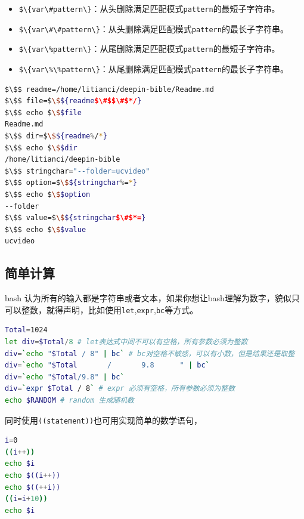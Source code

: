 \documentclass[doctor,openright,twoside]{sjtuthesis}
\providecommand{\tightlist}{%
    \setlength{\itemsep}{0pt}\setlength{\parskip}{0pt}}
\newcommand{\passthrough}[1]{#1}
\theoremstyle{plain}
\theoremstyle{definition}
\theoremstyle{remark}
\theoremstyle{ocrenumbox}
\theoremstyle{plain}
\begin{document}
\begin{itemize}
\tightlist
\item
  \passthrough{\lstinline!$\{var\#pattern\}!}：从头删除满足匹配模式\passthrough{\lstinline!pattern!}的最短子字符串。
\item
  \passthrough{\lstinline!$\{var\#\#pattern\}!}：从头删除满足匹配模式\passthrough{\lstinline!pattern!}的最长子字符串。
\item
  \passthrough{\lstinline!$\{var\%pattern\}!}：从尾删除满足匹配模式\passthrough{\lstinline!pattern!}的最短子字符串。
\item
  \passthrough{\lstinline!$\{var\%\%pattern\}!}：从尾删除满足匹配模式\passthrough{\lstinline!pattern!}的最长子字符串。
\end{itemize}

\lstset{mathescape=true}

\begin{lstlisting}[language=bash]
$\$$ readme=/home/litianci/deepin-bible/Readme.md
$\$$ file=$\$${readme$\#$$\#$*/}
$\$$ echo $\$$file 
Readme.md
$\$$ dir=$\$${readme%/*}
$\$$ echo $\$$dir
/home/litianci/deepin-bible
$\$$ stringchar="--folder=ucvideo"
$\$$ option=$\$${stringchar%=*}
$\$$ echo $\$$option
--folder
$\$$ value=$\$${stringchar$\#$*=}
$\$$ echo $\$$value
ucvideo
\end{lstlisting}

\lstset{mathescape=false}

\hypertarget{section-106}{%
\subsection{简单计算}\label{section-106}}

bash 认为所有的输入都是字符串或者文本，如果你想让bash理解为数字，貌似只可以整数，就得声明，比如使用\passthrough{\lstinline!let!},\passthrough{\lstinline!expr!},\passthrough{\lstinline!bc!}等方式。

\begin{lstlisting}[language=bash]
Total=1024
let div=$Total/8 # let表达式中间不可以有空格，所有参数必须为整数
div=`echo "$Total / 8" | bc` # bc对空格不敏感，可以有小数，但是结果还是取整
div=`echo "$Total       /       9.8      " | bc`
div=`echo "$Total/9.8" | bc`
div=`expr $Total / 8` # expr 必须有空格，所有参数必须为整数
echo $RANDOM # random 生成随机数
\end{lstlisting}

同时使用\passthrough{\lstinline!((statement))!}也可用实现简单的数学语句，

\begin{lstlisting}[language=bash]
i=0
((i++))
echo $i
echo $((i++))
echo $((++i))
((i=i+10))
echo $i
\end{lstlisting}
\end{document}
